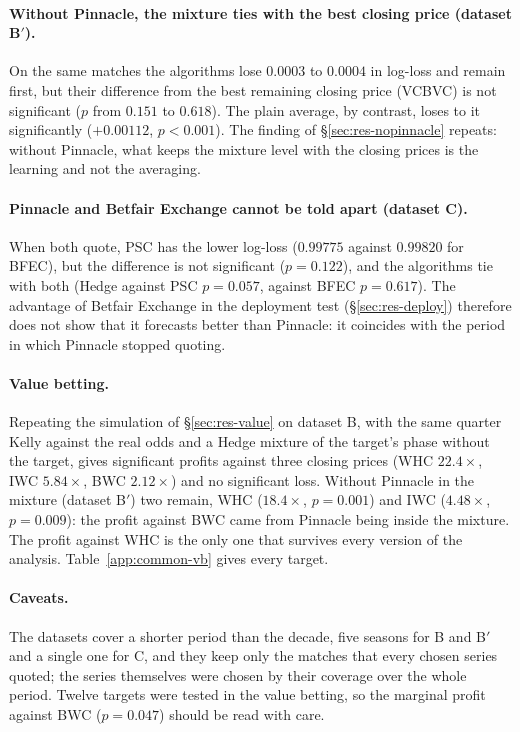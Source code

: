 \documentclass[12pt,a4paper,oneside]{report}
\renewcommand{\_}{\oldunderscore\allowbreak}
\theoremstyle{definition}
\theoremstyle{plain}
\theoremstyle{definition}   %
\begin{document}
\paragraph{Without Pinnacle, the mixture ties with the best closing price (dataset B$'$).} On the
same matches the algorithms lose $0.0003$ to $0.0004$ in log-loss and remain first, but their
difference from the best remaining closing price (VC\_BVC) is not significant ($p$ from $0.151$
to $0.618$). The plain average, by contrast, loses to it significantly ($+0.00112$,
$p<0.001$). The finding of \S\ref{sec:res-nopinnacle} repeats: without Pinnacle, what keeps the
mixture level with the closing prices is the learning and not the averaging.

\paragraph{Pinnacle and Betfair Exchange cannot be told apart (dataset C).} When both quote, PSC
has the lower log-loss ($0.99775$ against $0.99820$ for BFEC), but the difference is not
significant ($p=0.122$), and the algorithms tie with both (Hedge against PSC $p=0.057$, against
BFEC $p=0.617$). The advantage of Betfair Exchange in
the deployment test (\S\ref{sec:res-deploy}) therefore does not show that it forecasts better
than Pinnacle: it coincides with the period in which Pinnacle stopped quoting.

\paragraph{Value betting.} Repeating the simulation of \S\ref{sec:res-value} on dataset B, with the
same quarter Kelly against the real odds and a Hedge mixture of the target's phase without the
target, gives significant profits against three closing prices (WHC $22.4\times$, IWC
$5.84\times$, BWC $2.12\times$) and no significant loss. Without Pinnacle in the mixture (dataset
B$'$) two remain, WHC ($18.4\times$, $p=0.001$) and IWC ($4.48\times$, $p=0.009$): the profit
against BWC came from Pinnacle being inside the mixture. The profit against
WHC is the only one that survives every version of the analysis. Table~\ref{app:common-vb}
gives every target.

\paragraph{Caveats.} The datasets cover a shorter period than the decade, five seasons for B and
B$'$ and a single one for C, and they keep only the matches that every chosen series quoted; the
series themselves were chosen by their coverage over the whole period. Twelve targets were
tested in the value betting, so the marginal profit against BWC ($p=0.047$) should be read with
care.
\end{document}
